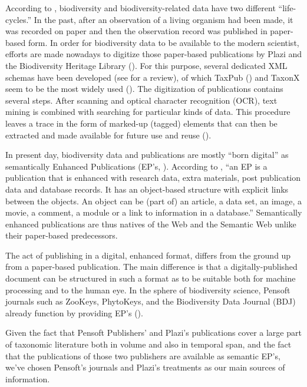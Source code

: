 According to \cite{noauthor_pro-ibiosphere_2014}, biodiversity and biodiversity-related data have two different ``life-cycles.'' In the past, after an observation of a living organism had been made, it was recorded on paper and then the observation record was published in paper-based form. In order for biodiversity data to be available to the modern scientist, efforts are made nowadays to digitize those paper-based publications by Plazi \cite{agosti_why_2007} and the Biodiversity Heritage Library (\cite{miller_taxonomic_2012}). For this purpose, several dedicated XML schemas have been developed (see \cite{penev_xml_2011} for a review), of which TaxPub (\cite{catapano_taxpub:_2010}) and TaxonX  seem to be the most widely used (\cite{penev_implementation_2012}). The digitization of publications contains several steps. After scanning and optical character recognition (OCR), text mining is combined with searching for particular kinds of data. This procedure leaves a trace in the form of marked-up (tagged) elements that can then be extracted and made available for future use and reuse (\cite{miller_integrating_2015}).

In present day, biodiversity data and publications are mostly ``born digital'' as semantically Enhanced Publications (EP's, \cite{claerbout_electronic_1992,godtsenhoven_van_emerging_2009,shotton_semantic_2009}). According to \cite{claerbout_electronic_1992}, ``an EP is a publication that is enhanced with research data, extra materials, post publication data and database records. It has an object-based structure with explicit links between the objects. An object can be (part of) an article, a data set, an image, a movie, a comment, a module or a link to information in a database.'' Semantically enhanced publications are thus natives of the Web and the Semantic Web unlike their paper-based predecessors.

The act of publishing in a digital, enhanced format, differs from the ground up from a paper-based publication. The main difference is that a digitally-published document can be structured in such a format as to be suitable both for machine processing and to the human eye. In the sphere of biodiversity science, Pensoft journals such as ZooKeys, PhytoKeys, and the Biodiversity Data Journal (BDJ) already function by providing EP's (\cite{penev_semantic_2010}).

Given the fact that Pensoft Publishers' and Plazi's publications cover a large part of taxonomic literature both in volume and also in temporal span, and the fact that the publications of those two publishers are available as semantic EP's, we've chosen Pensoft's journals and Plazi's treatments as our main sources of information.


